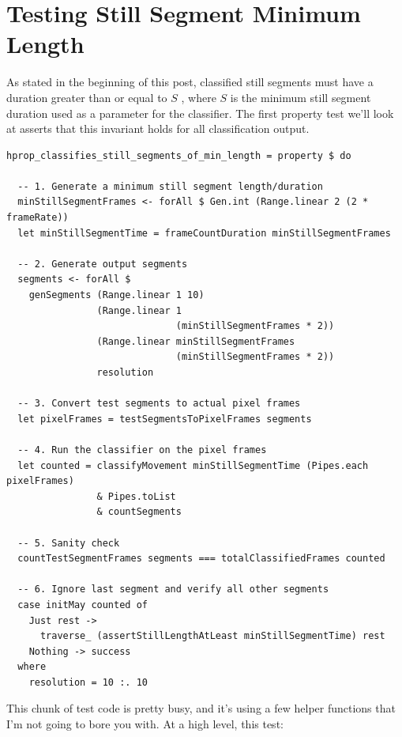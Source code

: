 \section{Testing Still Segment Minimum Length}

As stated in the beginning of this post, classified still segments must have a duration greater than or equal to $S$
, where $S$ is the minimum still segment duration used as a parameter for the classifier. The first property test we'll look at asserts that this invariant holds for all classification output.

\begin{verbatim}
hprop_classifies_still_segments_of_min_length = property $ do

  -- 1. Generate a minimum still segment length/duration
  minStillSegmentFrames <- forAll $ Gen.int (Range.linear 2 (2 * frameRate))
  let minStillSegmentTime = frameCountDuration minStillSegmentFrames

  -- 2. Generate output segments
  segments <- forAll $
    genSegments (Range.linear 1 10)
                (Range.linear 1
                              (minStillSegmentFrames * 2))
                (Range.linear minStillSegmentFrames
                              (minStillSegmentFrames * 2))
                resolution

  -- 3. Convert test segments to actual pixel frames
  let pixelFrames = testSegmentsToPixelFrames segments

  -- 4. Run the classifier on the pixel frames
  let counted = classifyMovement minStillSegmentTime (Pipes.each pixelFrames)
                & Pipes.toList
                & countSegments

  -- 5. Sanity check
  countTestSegmentFrames segments === totalClassifiedFrames counted

  -- 6. Ignore last segment and verify all other segments
  case initMay counted of
    Just rest ->
      traverse_ (assertStillLengthAtLeast minStillSegmentTime) rest
    Nothing -> success
  where
    resolution = 10 :. 10
\end{verbatim}
This chunk of test code is pretty busy, and it's using a few helper functions that I'm not going to bore you with. At a high level, this test:


